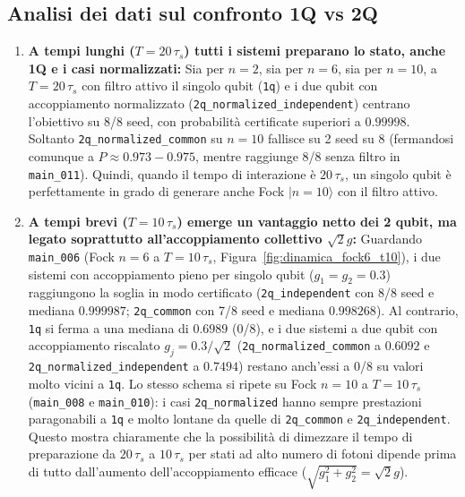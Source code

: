 \documentclass[11pt,a4paper]{article}
\begin{document}
\subsection*{Analisi dei dati sul confronto 1Q vs 2Q}

\begin{enumerate}
    \item \textbf{A tempi lunghi ($T = 20\,\tau_s$) tutti i sistemi preparano lo stato, anche 1Q e i casi normalizzati:}
    Sia per $n=2$, sia per $n=6$, sia per $n=10$, a $T=20\,\tau_s$ con filtro attivo il singolo qubit (\texttt{1q}) e i due qubit con accoppiamento normalizzato (\texttt{2q\_normalized\_independent}) centrano l'obiettivo su 8/8 seed, con probabilità certificate superiori a $0.99998$. Soltanto \texttt{2q\_normalized\_common} su $n=10$ fallisce su 2 seed su 8 (fermandosi comunque a $P \approx 0.973 - 0.975$, mentre raggiunge 8/8 senza filtro in \texttt{main\_011}). Quindi, quando il tempo di interazione è $20\,\tau_s$, un singolo qubit è perfettamente in grado di generare anche Fock $|n=10\rangle$ con il filtro attivo.

    \item \textbf{A tempi brevi ($T = 10\,\tau_s$) emerge un vantaggio netto dei 2 qubit, ma legato soprattutto all'accoppiamento collettivo $\sqrt{2}g$:}
    Guardando \texttt{main\_006} (Fock $n=6$ a $T=10\,\tau_s$, Figura~\ref{fig:dinamica_fock6_t10}), i due sistemi con accoppiamento pieno per singolo qubit ($g_1=g_2=0.3$) raggiungono la soglia in modo certificato (\texttt{2q\_independent} con 8/8 seed e mediana $0.999987$; \texttt{2q\_common} con 7/8 seed e mediana $0.998268$). Al contrario, \texttt{1q} si ferma a una mediana di $0.6989$ (0/8), e i due sistemi a due qubit con accoppiamento riscalato $g_j = 0.3/\sqrt{2}$ (\texttt{2q\_normalized\_common} a $0.6092$ e \texttt{2q\_normalized\_independent} a $0.7494$) restano anch'essi a 0/8 su valori molto vicini a \texttt{1q}.
    Lo stesso schema si ripete su Fock $n=10$ a $T=10\,\tau_s$ (\texttt{main\_008} e \texttt{main\_010}): i casi \texttt{2q\_normalized} hanno sempre prestazioni paragonabili a \texttt{1q} e molto lontane da quelle di \texttt{2q\_common} e \texttt{2q\_independent}. Questo mostra chiaramente che la possibilità di dimezzare il tempo di preparazione da $20\,\tau_s$ a $10\,\tau_s$ per stati ad alto numero di fotoni dipende prima di tutto dall'aumento dell'accoppiamento efficace ($\sqrt{g_1^2+g_2^2} = \sqrt{2}g$).


\end{enumerate}
\end{document}
